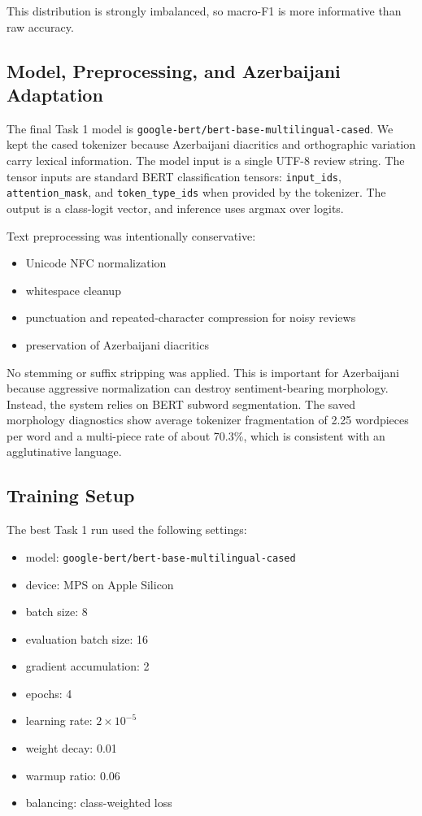 \documentclass[11pt]{article}
\begin{document}
This distribution is strongly imbalanced, so macro-F1 is more informative than raw accuracy.

\subsection{Model, Preprocessing, and Azerbaijani Adaptation}
The final Task 1 model is \texttt{google-bert/bert-base-multilingual-cased}. We kept the cased tokenizer because Azerbaijani diacritics and orthographic variation carry lexical information. The model input is a single UTF-8 review string. The tensor inputs are standard BERT classification tensors:
\texttt{input\_ids}, \texttt{attention\_mask}, and \texttt{token\_type\_ids} when provided by the tokenizer. The output is a class-logit vector, and inference uses argmax over logits.

Text preprocessing was intentionally conservative:
\begin{itemize}
    \item Unicode NFC normalization
    \item whitespace cleanup
    \item punctuation and repeated-character compression for noisy reviews
    \item preservation of Azerbaijani diacritics
\end{itemize}

No stemming or suffix stripping was applied. This is important for Azerbaijani because aggressive normalization can destroy sentiment-bearing morphology. Instead, the system relies on BERT subword segmentation. The saved morphology diagnostics show average tokenizer fragmentation of 2.25 wordpieces per word and a multi-piece rate of about 70.3\%, which is consistent with an agglutinative language.

\subsection{Training Setup}
The best Task 1 run used the following settings:
\begin{itemize}
    \item model: \texttt{google-bert/bert-base-multilingual-cased}
    \item device: MPS on Apple Silicon
    \item batch size: 8
    \item evaluation batch size: 16
    \item gradient accumulation: 2
    \item epochs: 4
    \item learning rate: \(2 \times 10^{-5}\)
    \item weight decay: 0.01
    \item warmup ratio: 0.06
    \item balancing: class-weighted loss
\end{itemize}
\end{document}

